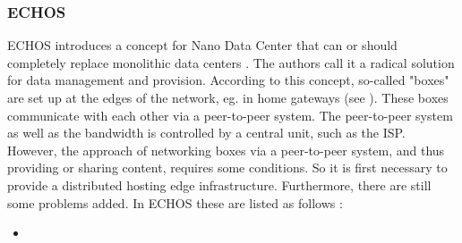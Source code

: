\subsubsection{ECHOS}
ECHOS introduces a concept for Nano Data Center that can or should completely replace monolithic data centers \cite{Laoutaris:2008:EEC:1341431.1341442}. The authors call it a radical solution for data management and provision.
According to this concept, so-called "boxes" are set up at the edges of the network, eg. in home gateways (see \cite{technicolor}). These boxes communicate with each other via a peer-to-peer system. The peer-to-peer system as well as the bandwidth is controlled by a central unit, such as the ISP. However, the approach of networking boxes via a peer-to-peer system, and thus providing or sharing content, requires some conditions. So it is first necessary to provide a distributed hosting edge infrastructure. Furthermore, there are still some problems added. In ECHOS these are listed as follows \cite{Laoutaris:2008:EEC:1341431.1341442}:
\begin{itemize}
	\item 
\end{itemize}
